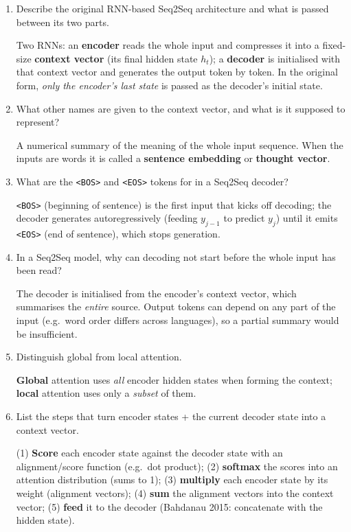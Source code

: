 \documentclass[10pt,a4paper]{article}
\newcommand{\q}[1]{\item #1}
\begin{document}
\begin{enumerate}[leftmargin=*,label=\textbf{Q\arabic*.}]
\q Describe the original RNN-based Seq2Seq architecture and what is passed between its two parts.
\begin{answerbox}
Two RNNs: an \textbf{encoder} reads the whole input and compresses it into a fixed-size \textbf{context vector} (its final hidden state $h_t$); a \textbf{decoder} is initialised with that context vector and generates the output token by token. In the original form, \emph{only the encoder's last state} is passed as the decoder's initial state.
\end{answerbox}

\q What other names are given to the context vector, and what is it supposed to represent?
\begin{answerbox}
A numerical summary of the meaning of the whole input sequence. When the inputs are words it is called a \textbf{sentence embedding} or \textbf{thought vector}.
\end{answerbox}

\q What are the \texttt{<BOS>} and \texttt{<EOS>} tokens for in a Seq2Seq decoder?
\begin{answerbox}
\texttt{<BOS>} (beginning of sentence) is the first input that kicks off decoding; the decoder generates autoregressively (feeding $y_{j-1}$ to predict $y_j$) until it emits \texttt{<EOS>} (end of sentence), which stops generation.
\end{answerbox}

\q In a Seq2Seq model, why can decoding not start before the whole input has been read?
\begin{answerbox}
The decoder is initialised from the encoder's context vector, which summarises the \emph{entire} source. Output tokens can depend on any part of the input (e.g.\ word order differs across languages), so a partial summary would be insufficient.
\end{answerbox}

\q Distinguish global from local attention.
\begin{answerbox}
\textbf{Global} attention uses \emph{all} encoder hidden states when forming the context; \textbf{local} attention uses only a \emph{subset} of them.
\end{answerbox}

\q List the steps that turn encoder states + the current decoder state into a context vector.
\begin{answerbox}
(1) \textbf{Score} each encoder state against the decoder state with an alignment/score function (e.g.\ dot product); (2) \textbf{softmax} the scores into an attention distribution (sums to 1); (3) \textbf{multiply} each encoder state by its weight (alignment vectors); (4) \textbf{sum} the alignment vectors into the context vector; (5) \textbf{feed} it to the decoder (Bahdanau 2015: concatenate with the hidden state).
\end{answerbox}


\end{enumerate}
\end{document}
